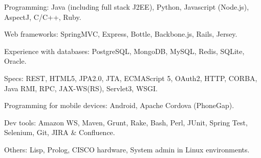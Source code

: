 \begin{rlist}
  \item Programming: Java (including full stack J2EE), Python, Javascript (Node.js),
  AspectJ, C/C++, Ruby.
  \item Web frameworks: SpringMVC, Express, Bottle, Backbone.js, Rails, Jersey.
  \item Experience with databases: PostgreSQL, MongoDB, MySQL, Redis, SQLite, Oracle.
  \item Specs: REST, HTML5, JPA2.0, JTA, ECMAScript 5, OAuth2, HTTP,
  CORBA, Java RMI, RPC, JAX-WS(RS), Servlet3, WSGI.
  \item Programming for mobile devices: Android, Apache Cordova (PhoneGap).
  \item Dev tools: Amazon WS, Maven, Grunt, Rake, Bash, Perl, JUnit, Spring Test,
  Selenium, Git, JIRA \& Confluence.
  \item Others: Lisp, Prolog, CISCO hardware, System admin in Linux
  environments.
\end{rlist}

